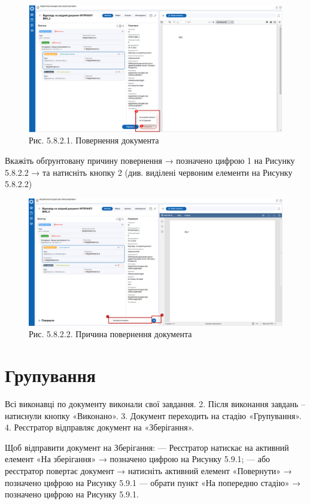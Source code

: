 \begin{figure}[!htbp]
\centerline{\includegraphics[width=\textwidth]{img/5.8.2.1.png}}
\caption{Рис. 5.8.2.1. Повернення документа}
\end{figure}

Вкажіть обґрунтовану причину повернення → позначено цифрою 1 на
Рисунку 5.8.2.2 → та натисніть кнопку 2 (див. виділені червоним елементи
на Рисунку 5.8.2.2)

\begin{figure}[!htbp]
\centerline{\includegraphics[width=\textwidth]{img/5.8.2.2.png}}
\caption{Рис. 5.8.2.2. Причина повернення документа}
\end{figure}

\section{Групування}

Всі виконавці по документу виконали свої завдання.
2. Після виконання завдань – натиснули кнопку «Виконано».
3. Документ переходить на стадію «Групування».
4. Реєстратор відправляє документ на «Зберігання».

Щоб відправити документ на Зберігання:
--- Реєстратор натискає на активний елемент «На зберігання» → позначено цифрою  на Рисунку 5.9.1;
--- або реєстратор повертає документ → натисніть активний елемент «Повернути» → позначено цифрою  на Рисунку 5.9.1
--- обрати пункт «На попередню стадію» → позначено цифрою  на Рисунку 5.9.1.

